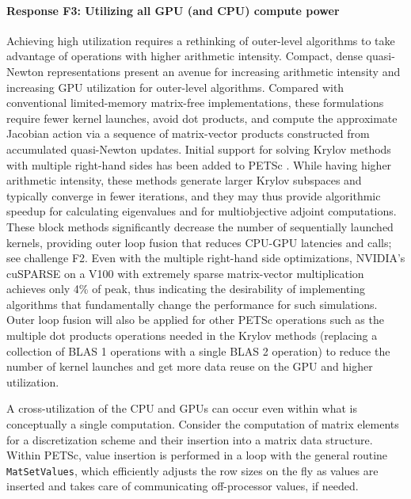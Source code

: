\documentclass[5p,times]{elsarticle}
\begin{document}

\paragraph{Response F3: Utilizing all GPU (and CPU) compute power}

Achieving high utilization requires a rethinking of outer-level algorithms to take
advantage of operations with higher arithmetic intensity.
Compact, dense quasi-Newton representations present an avenue for increasing arithmetic intensity and increasing GPU utilization for outer-level algorithms.
Compared with conventional limited-memory matrix-free implementations, these formulations require fewer kernel launches, avoid dot products, and compute the approximate Jacobian action via a sequence of matrix-vector products constructed from accumulated quasi-Newton updates.
Initial support
for solving Krylov methods with multiple right-hand sides has
 been added to PETSc \cite{KSPHPDDM}. While having higher
arithmetic intensity, these methods generate larger Krylov subspaces and typically converge
in fewer iterations, and they may thus provide algorithmic speedup for calculating eigenvalues and for multiobjective adjoint computations.
These block methods significantly decrease the number of sequentially launched kernels, providing outer loop fusion
that reduces CPU\hyp{}GPU latencies and calls; see challenge F2. Even with the multiple right-hand side optimizations, NVIDIA's cuSPARSE on a V100
with extremely sparse matrix-vector multiplication  achieves only 4\% of peak, thus indicating the desirability of implementing algorithms that 
fundamentally change the performance for such simulations.
Outer loop fusion will also be applied for other PETSc operations such as the multiple dot products 
operations needed in the Krylov methods (replacing a collection of BLAS 1 operations with a single BLAS 2 operation) to reduce
the number of kernel launches and get more data reuse on the GPU and higher utilization.

A cross-utilization of the CPU and GPUs can occur even within what is
conceptually a single computation. Consider the computation of matrix elements
for a discretization scheme and their insertion into a matrix data
structure. Within PETSc, value insertion is performed in a loop with the
general routine {\tt MatSetValues}, which efficiently adjusts the row sizes
on the fly as values are inserted and takes care of communicating off-processor
values, if needed. 
\end{document}

